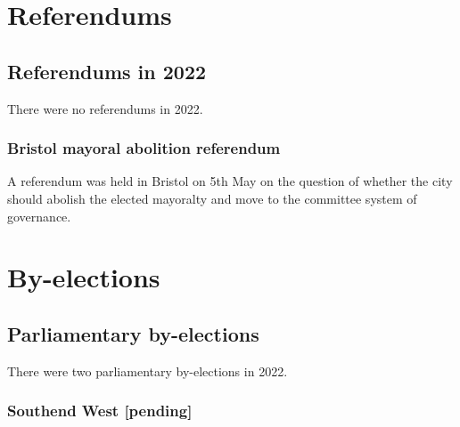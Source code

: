 \documentclass[a4paper,openany]{book}
\begin{document}



\part{Referendums}

\chapter{Referendums in 2022}

There were no referendums in 2022.

\section{Bristol mayoral abolition referendum}

A referendum was held in Bristol on 5th May on the question of whether the city should abolish the elected mayoralty and move to the committee system of governance.


\part{By-elections}

\chapter{Parliamentary by-elections}

There were two parliamentary by-elections in 2022.

%
%
%
%
%
%
%

\section*{Southend West \hspace*{\fill}\nolinebreak[1]%
	\enspace\hspace*{\fill}
	[pending]}
\end{document}

